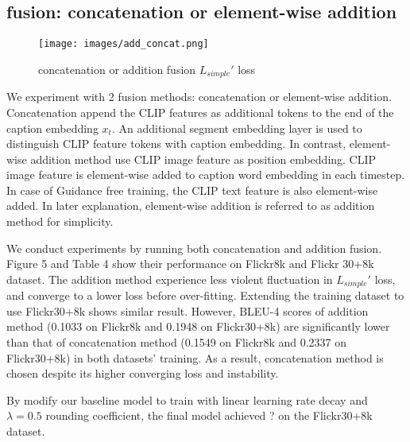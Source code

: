 \documentclass{article}
\begin{document}
\subsection{fusion: concatenation or element-wise addition}
\label{sec:fusion-exp}
\begin{figure}
  \centering
  \texttt{[image: images/add\_concat.png]}
  \caption{concatenation or addition fusion $L_{simple}'$ loss}
  \label{fig:fusion}
\end{figure}

We experiment with 2 fusion methods: concatenation or element-wise addition. Concatenation append the CLIP features as additional tokens to the end of the caption embedding $x_t$. An additional segment embedding layer is used to distinguish CLIP feature tokens with caption embedding. In contrast, element-wise addition method use CLIP image feature as position embedding. CLIP image feature is element-wise added to caption word embedding in each timestep. In case of Guidance free training, the CLIP text feature is also element-wise added. In later explanation, element-wise addition is referred to as addition method for simplicity.

We conduct experiments by running both concatenation and addition fusion. Figure 5 and Table 4 show their performance on Flickr8k and Flickr 30+8k dataset. The addition method experience less violent fluctuation in $L_{simple}'$ loss, and converge to a lower loss before over-fitting. Extending the training dataset to use Flickr30+8k shows similar result. However, BLEU-4 scores of addition method (0.1033 on Flickr8k and 0.1948 on Flickr30+8k) are significantly lower than that of concatenation method (0.1549 on Flickr8k and 0.2337 on Flickr30+8k) in both datasets' training. As a result, concatenation method is chosen despite its higher converging loss and instability. 

By modify our baseline model to train with linear learning rate decay and $\lambda = 0.5$ rounding coefficient, the final model achieved ? on the Flickr30+8k dataset.
\end{document}
